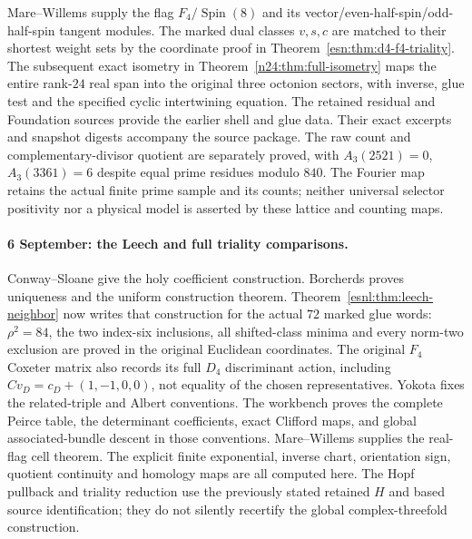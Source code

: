 Mare--Willems \cite[Definition~2.2, Propositions~2.4 and~2.7,
and equations (5.4)--(5.6)]{esn:MareWillems2013} supply the flag
$F_4/\operatorname{Spin}(8)$ and its vector/even-half-spin/odd-half-spin
tangent modules. The marked dual classes $v,s,c$ are matched to their
shortest weight sets by the coordinate proof in
Theorem~\ref{esn:thm:d4-f4-triality}. The subsequent exact isometry
in Theorem~\ref{n24:thm:full-isometry} maps the entire rank-$24$
real span into the original three octonion sectors, with inverse,
glue test and the specified cyclic intertwining equation.
The retained residual and Foundation sources
\cite{esn:Residual2026,esn:ESMain2026,esn:Provenance} provide the earlier
shell and glue data. Their exact excerpts and snapshot digests accompany
the source package. The raw count and complementary-divisor quotient
are separately proved, with $A_3(2521)=0$, $A_3(3361)=6$ despite equal
prime residues modulo $840$. The Fourier map retains the actual finite
prime sample and its counts; neither universal selector positivity
nor a physical model is asserted by these lattice and counting maps.

\paragraph{6 September: the Leech and full triality comparisons.}
Conway--Sloane \cite[pp.~277--280]{esn:ConwaySloane1982} give the
holy coefficient construction. Borcherds \cite[Sections~6--7]{esn:Borcherds1985}
proves uniqueness and the uniform construction theorem.
Theorem~\ref{esnl:thm:leech-neighbor} now writes that construction for
the actual $72$ marked glue words: $\rho^2=84$, the two index-six
inclusions, all shifted-class minima and every norm-two exclusion are
proved in the original Euclidean coordinates. The original
$F_4$ Coxeter matrix also records its full $D_4$ discriminant action,
including $Cv_D=c_D+(1,-1,0,0)$, not equality of the chosen representatives.
Yokota \cite[Sections~1.10, 1.14, 1.16; Theorem~2.7.1]{h24:Yokota2009}
fixes the related-triple and Albert conventions. The workbench proves
the complete Peirce table, the determinant coefficients, exact Clifford
maps, and global associated-bundle descent in those conventions.
Mare--Willems \cite[Appendix~B, p.~519; orientation convention pp.~495--496]{esn:MareWillems2013}
supplies the real-flag cell theorem. The explicit finite exponential,
inverse chart, orientation sign, quotient continuity and homology maps
are all computed here. The Hopf pullback and triality reduction use
the previously stated retained $H$ and based source identification;
they do not silently recertify the global complex-threefold construction.
